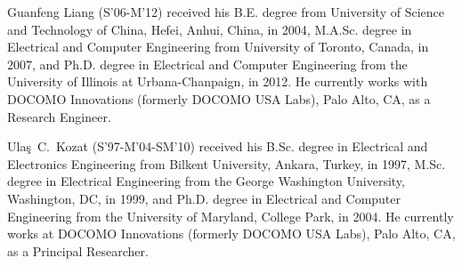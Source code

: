 \documentclass[journal]{IEEEtran}
\begin{document}
\begin{IEEEbiography}{Guanfeng Liang}
(S'06-M'12)
received his B.E. degree from University of Science and Technology of China, Hefei, Anhui, China, in 2004, M.A.Sc. degree in Electrical and Computer Engineering from  University of Toronto, Canada, in 2007, and Ph.D. degree in Electrical and Computer Engineering from the University of Illinois at Urbana-Chanpaign, in 2012. 
He currently works with DOCOMO Innovations (formerly DOCOMO USA Labs), Palo Alto, CA, as a Research Engineer. 
\end{IEEEbiography}

\begin{IEEEbiography}{Ula\c{s}~C.~Kozat} 
(S’97-M’04-SM’10) received his
B.Sc. degree in Electrical and Electronics Engineering
from Bilkent University, Ankara, Turkey, in 1997,
M.Sc. degree in Electrical Engineering from the
George Washington University, Washington, DC, in
1999, and Ph.D. degree in Electrical and Computer
Engineering from the University of Maryland,
College Park, in 2004. He currently works at DOCOMO Innovations (formerly DOCOMO USA Labs), Palo Alto, CA, as
a Principal Researcher.

\end{IEEEbiography}
\end{document}
